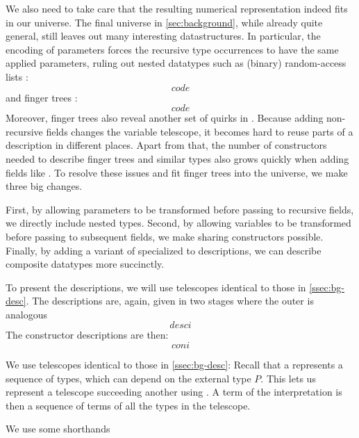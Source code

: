 We also need to take care that the resulting numerical representation indeed fits in our universe. The final universe  in \autoref{sec:background}, while already quite general, still leaves out many interesting datastructures. In particular, the encoding of parameters forces the recursive type occurrences to have the same applied parameters, ruling out nested datatypes such as (binary) random-access lists \cite{calcdata,purelyfunctional}:
\[ code \]
and finger trees \cite{ralf}:
\[ code \]
Moreover, finger trees also reveal another set of quirks in . Because adding non-recursive fields changes the variable telescope, it becomes hard to reuse parts of a description in different places. Apart from that, the number of constructors needed to describe finger trees and similar types also grows quickly when adding fields like . To resolve these issues and fit finger trees into the universe, we make three big changes.

First, by allowing parameters to be transformed before passing to recursive fields, we directly include nested types. Second, by allowing variables to be transformed before passing to subsequent fields, we make sharing constructors possible. Finally, by adding a variant of  specialized to descriptions, we can describe composite datatypes more succinctly.

To present the descriptions, we will use telescopes identical to those in \autoref{ssec:bg-desc}.
The descriptions are, again, given in two stages where the outer is analogous
\[ desci \]
The constructor descriptions are then:
\[ coni \]




We use telescopes identical to those in \autoref{ssec:bg-desc}:
Recall that a  represents a sequence of types, which can depend on the external type $P$. This lets us represent a telescope succeeding another using . A term of the interpretation  is then a sequence of terms of all the types in the telescope.

We use some shorthands

